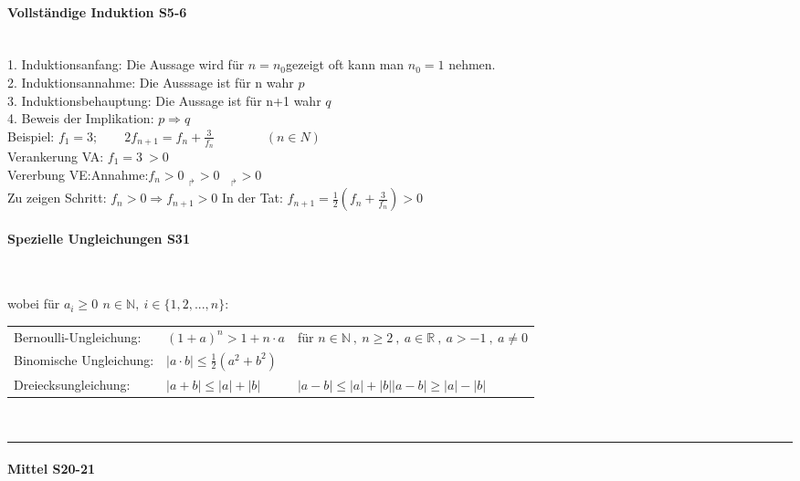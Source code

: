 \documentclass[6pt,a4paper]{scrartcl}
\newcommand{\abs}[1]{\ensuremath{\left\vert#1\right\vert}}
\begin{document}
\begin{multicols*}{2}
\paragraph{Vollständige Induktion \color{red} S5-6}\
\color{black}
\label{sub:allgemeines}
\\
1. Induktionsanfang: 		Die Aussage wird für $n = n_{0}$gezeigt oft kann man $n_{0}=1$ nehmen.\\
2. Induktionsannahme: 		Die Ausssage ist für n wahr $p$\\
3. Induktionsbehauptung:	Die Aussage ist für n+1 wahr $q$\\
4. Beweis der Implikation: $p \Rightarrow q$\\
Beispiel: $f_{1}=3;\qquad 2f_{n+1}=f_{n}+\frac{3}{f_{n}} \qquad\qquad(n \in N)$\\
Verankerung VA: $f_{1}=3 \ >0$  \\
Vererbung VE:Annahme:$f_{n}>0$  \qquad\quad \qquad\qquad\qquad\qquad\qquad\qquad\qquad\qquad $_{\Rsh} >0 $ \  $_{\Rsh} >0$\\
Zu zeigen Schritt: $f_{n}>0\Rightarrow f_{n+1}>0$	\qquad \qquad In der Tat: $f_{n+1}= \frac{1}{2}\left(f_{n}+\frac{3}{f_{n}}\right) >0$
\paragraph{Spezielle Ungleichungen \color{red} S31}\

wobei für $a_{i} \geq 0\,\ n \in \mathbb N ,\ i \in \{1,2,...,n\} $:\\
\begin{tabulary}{12cm}{LLL}
Bernoulli-Ungleichung: 	&	$ (1+a)^{n} > 1 +n\cdot a $	&	für $ n \in \mathbb N\ ,\ n\geq 2\ ,\ a\in \mathbb R\ ,\ a > -1\ ,\ a\neq 0  $ \\
Binomische Ungleichung:	&	$ \abs{a\cdot b}\leq\frac{1}{2}(a^{2}+b^{2}) $ & \\
Dreiecksungleichung:	& 	$ \abs{a+b} \leq \abs{a}+ \abs{b} $	& $ \abs{a-b}\leq \abs{a}+ \abs{b} $\qquad $\abs{a-b}\geq \abs{a}- \abs{b}$\\
\end{tabulary}\\

\hrule
\paragraph{Mittel \color{red} S20-21}\


\end{multicols*}
\end{document}
